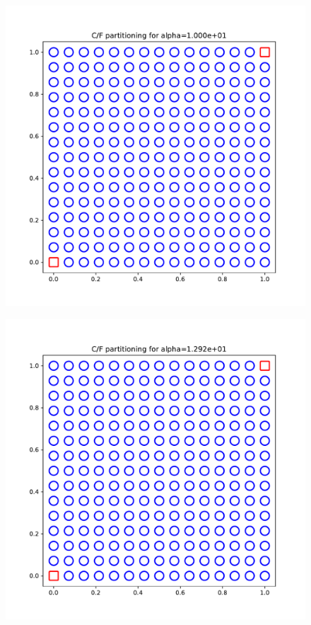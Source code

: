 \documentclass{article}
\begin{document}
\begin{figure}[h]
  \includegraphics[width=\textwidth]{figures/cf_13.pdf}
\end{figure}

\begin{figure}[h]
  \includegraphics[width=\textwidth]{figures/cf_14.pdf}
\end{figure}
\end{document}
